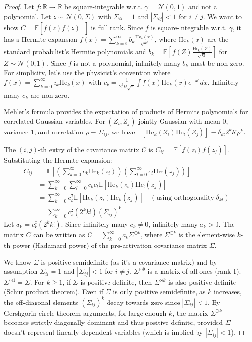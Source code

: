\documentclass{article}
\newcommand{\R}{\mathbb{R}}
\newcommand{\E}{\mathbb{E}}
\newcommand{\He}{\mathrm{He}}
\begin{document}
\begin{proof}
    Let $f:\R\to\R$ be square-integrable w.r.t. $\gamma = \mathcal{N}(0,1)$ and not a polynomial. Let $z \sim \mathcal{N}(0, \Sigma)$ with $\Sigma_{ii}=1$ and $|\Sigma_{ij}| < 1$ for $i \neq j$. We want to show $C = \E[f(z)f(z)^\top]$ is full rank.
    Since $f$ is square-integrable w.r.t. $\gamma$, it has a Hermite expansion $f(x) = \sum_{k=0}^{\infty} b_k \frac{\He_k(x)}{\sqrt{k!}}$, where $\He_k(x)$ are the standard probabilist's Hermite polynomials and $b_k = \E[f(Z) \frac{\He_k(Z)}{\sqrt{k!}}]$ for $Z \sim \mathcal{N}(0,1)$. Since $f$ is not a polynomial, infinitely many $b_k$ must be non-zero. For simplicity, let's use the physicist's convention where $f(x) = \sum_{k=0}^{\infty} c_k \He_k(x)$ with $c_k = \frac{1}{2^k k! \sqrt{\pi}} \int f(x) \He_k(x) e^{-x^2} dx$. Infinitely many $c_k$ are non-zero.

    Mehler's formula \cite{mehler1866ueber, erdelyi1953higher} provides the expectation of products of Hermite polynomials for correlated Gaussian variables. For $(Z_i, Z_j)$ jointly Gaussian with mean 0, variance 1, and correlation $\rho = \Sigma_{ij}$, we have $\E[\He_k(Z_i) \He_l(Z_j)] = \delta_{kl} 2^k k! \rho^k$.

    The $(i, j)$-th entry of the covariance matrix $C$ is $C_{ij} = \E[f(z_i) f(z_j)]$. Substituting the Hermite expansion:
    \begin{align*}
    C_{ij} &= \E\left[ \left( \sum_{k=0}^{\infty} c_k \He_k(z_i) \right) \left( \sum_{l=0}^{\infty} c_l \He_l(z_j) \right) \right] \\
    &= \sum_{k=0}^{\infty} \sum_{l=0}^{\infty} c_k c_l \E[\He_k(z_i) \He_l(z_j)] \\
    &= \sum_{k=0}^{\infty} c_k^2 \E[\He_k(z_i) \He_k(z_j)] \quad (\text{using orthogonality } \delta_{kl}) \\
    &= \sum_{k=0}^{\infty} c_k^2 (2^k k!) (\Sigma_{ij})^k
    \end{align*}
    Let $a_k = c_k^2 (2^k k!)$. Since infinitely many $c_k \neq 0$, infinitely many $a_k > 0$. The matrix $C$ can be written as $C = \sum_{k=0}^{\infty} a_k \Sigma^{\odot k}$, where $\Sigma^{\odot k}$ is the element-wise $k$-th power (Hadamard power) of the pre-activation covariance matrix $\Sigma$.

    We know $\Sigma$ is positive semidefinite (as it's a covariance matrix) and by assumption $\Sigma_{ii}=1$ and $|\Sigma_{ij}|<1$ for $i \neq j$. $\Sigma^{\odot 0}$ is a matrix of all ones (rank 1). $\Sigma^{\odot 1} = \Sigma$. For $k \ge 1$, if $\Sigma$ is positive definite, then $\Sigma^{\odot k}$ is also positive definite (Schur product theorem). Even if $\Sigma$ is only positive semidefinite, as $k$ increases, the off-diagonal elements $(\Sigma_{ij})^k$ decay towards zero since $|\Sigma_{ij}|<1$. By Gershgorin circle theorem arguments, for large enough $k$, the matrix $\Sigma^{\odot k}$ becomes strictly diagonally dominant and thus positive definite, provided $\Sigma$ doesn't represent linearly dependent variables (which is implied by $|\Sigma_{ij}|<1$).


\end{proof}
\end{document}
